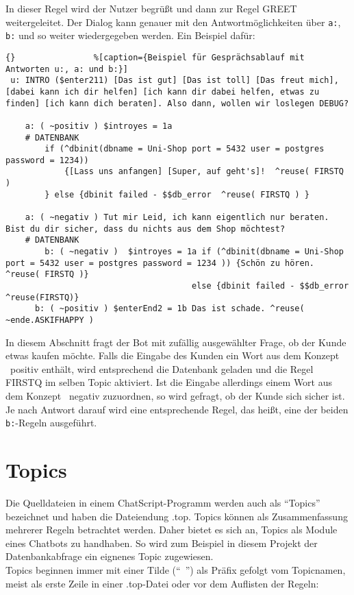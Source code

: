 In dieser Regel wird der Nutzer begrüßt und dann zur Regel GREET weitergeleitet.
Der Dialog kann genauer mit den Antwortmöglichkeiten über \lstinline|a:|, \lstinline|b:| und so weiter wiedergegeben werden. Ein Beispiel dafür:

\begin{lstlisting}{}				%[caption={Beispiel für Gesprächsablauf mit Antworten u:, a: und b:}]
 u: INTRO ($enter211) [Das ist gut] [Das ist toll] [Das freut mich], [dabei kann ich dir helfen] [ich kann dir dabei helfen, etwas zu finden] [ich kann dich beraten]. Also dann, wollen wir loslegen DEBUG?

	a: ( ~positiv ) $introyes = 1a
	# DATENBANK
	    if (^dbinit(dbname = Uni-Shop port = 5432 user = postgres password = 1234))
	        {[Lass uns anfangen] [Super, auf geht's]!  ^reuse( FIRSTQ )
	    } else {dbinit failed - $$db_error  ^reuse( FIRSTQ ) }
			
	a: ( ~negativ ) Tut mir Leid, ich kann eigentlich nur beraten. Bist du dir sicher, dass du nichts aus dem Shop möchtest?
	# DATENBANK
		b: ( ~negativ )  $introyes = 1a if (^dbinit(dbname = Uni-Shop port = 5432 user = postgres password = 1234 )) {Schön zu hören. ^reuse( FIRSTQ )}
                                      else {dbinit failed - $$db_error ^reuse(FIRSTQ)}
	  b: ( ~positiv ) $enterEnd2 = 1b Das ist schade. ^reuse( ~ende.ASKIFHAPPY )
\end{lstlisting}

In diesem Abschnitt fragt der Bot mit zufällig ausgewählter Frage, ob der Kunde etwas kaufen möchte. Falls die Eingabe des Kunden ein Wort aus dem Konzept ~positiv enthält, wird entsprechend die Datenbank geladen und die Regel FIRSTQ im selben Topic aktiviert. Ist die Eingabe allerdings einem Wort aus dem Konzept ~negativ zuzuordnen, so wird gefragt, ob der Kunde sich sicher ist. Je nach Antwort darauf wird eine entsprechende Regel, das heißt, eine der beiden \lstinline|b:|-Regeln ausgeführt.\\ 


\section{Topics}
\label{sec:ChatScript: Topics}

Die Quelldateien in einem ChatScript-Programm werden auch als "`Topics"' bezeichnet und haben die Dateiendung .top. Topics können als Zusammenfassung mehrerer Regeln betrachtet werden. Daher bietet es sich an, Topics als Module eines Chatbots zu handhaben. So wird zum Beispiel in diesem Projekt der Datenbankabfrage ein eignenes Topic zugewiesen.\\
Topics beginnen immer mit einer Tilde ("`~"') als Präfix gefolgt vom Topicnamen, meist als erste Zeile in einer .top-Datei oder vor dem Auflisten der Regeln:

